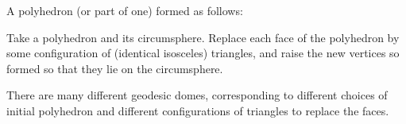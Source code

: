  A polyhedron (or part of one) formed as follows:
\par
Take a polyhedron and its circumsphere. Replace each
face of the polyhedron by some configuration of (identical 
isosceles) triangles, and raise the new vertices so formed
so that they lie on the circumsphere.
\par
There are many different geodesic domes, corresponding
to different choices of initial polyhedron and different
configurations of triangles to replace the faces.
